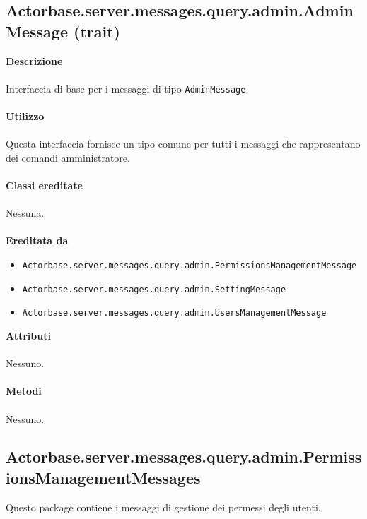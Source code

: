 \documentclass[a4paper]{article}
\begin{document}
\subsection{Actorbase.server.messages.query.admin.AdminMessage (trait)}
		\textbf{Descrizione}
			\\ \\
			Interfaccia di base per i messaggi di tipo \texttt{AdminMessage}.
			\\ \\
		\textbf{Utilizzo}
			\\ \\
			Questa interfaccia fornisce un tipo comune per tutti i messaggi che rappresentano dei comandi amministratore.
			\\ \\
		\textbf{Classi ereditate}
			\\ \\
			Nessuna.
			\\ \\
		\textbf{Ereditata da}
			\begin{itemize}
				\item \texttt{Actorbase.server.messages.query.admin.PermissionsManagementMessage}
				\item \texttt{Actorbase.server.messages.query.admin.SettingMessage}
				\item \texttt{Actorbase.server.messages.query.admin.UsersManagementMessage}
			\end{itemize}
		\textbf{Attributi}
			\\ \\
			Nessuno.
			\\ \\
		\textbf{Metodi}
			\\ \\
			Nessuno.
			
	\subsection{Actorbase.server.messages.query.admin.PermissionsManagementMessages}
		Questo package contiene i messaggi di gestione dei permessi degli utenti.
		
\end{document}
